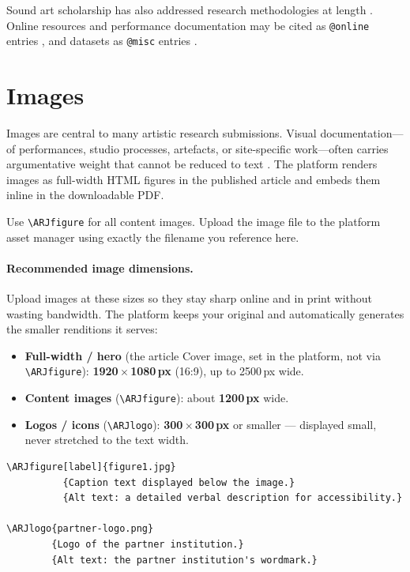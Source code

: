 Sound art scholarship has also addressed research methodologies at
length \citep{lee2023sound}. Online resources and performance
documentation may be cited as \texttt{@online} entries
\citep{video_example}, and datasets as \texttt{@misc} entries
\citep{dataset_example}.

\section{Images}

Images are central to many artistic research submissions. Visual
documentation---of performances, studio processes, artefacts, or
site-specific work---often carries argumentative weight that cannot be
reduced to text \citep{jones2023practice}. The platform renders images
as full-width HTML figures in the published article and embeds them
inline in the downloadable PDF.

Use \verb|\ARJfigure| for all content images. Upload the image file to the
platform asset manager using exactly the filename you reference here.

\paragraph{Recommended image dimensions.} Upload images at these sizes so they
stay sharp online and in print without wasting bandwidth. The platform keeps
your original and automatically generates the smaller renditions it serves:
\begin{itemize}
  \item \textbf{Full-width / hero} (the article Cover image, set in the
        platform, not via \verb|\ARJfigure|): \textbf{1920\,$\times$\,1080\,px}
        (16:9), up to 2500\,px wide.
  \item \textbf{Content images} (\verb|\ARJfigure|): about \textbf{1200\,px}
        wide.
  \item \textbf{Logos / icons} (\verb|\ARJlogo|): \textbf{300\,$\times$\,300\,px}
        or smaller — displayed small, never stretched to the text width.
\end{itemize}

\begin{verbatim}
\ARJfigure[label]{figure1.jpg}
          {Caption text displayed below the image.}
          {Alt text: a detailed verbal description for accessibility.}

\ARJlogo{partner-logo.png}
        {Logo of the partner institution.}
        {Alt text: the partner institution's wordmark.}
\end{verbatim}

